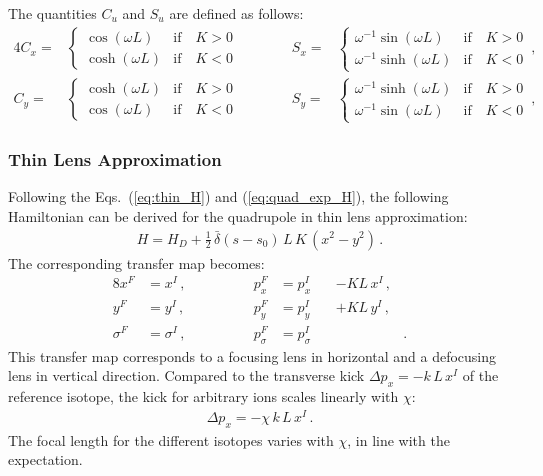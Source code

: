 The quantities $C_u$ and $S_u$ are defined as follows:
\begin{alignat}{4}
C_x = &\begin{cases}  \cos \left( \omega L \right)  & \text{if} \quad  K>0 \\ 
\cosh \left( \omega L \right)  & \text{if} \quad  K<0 \end{cases} \quad \quad \quad&S_x = &\begin{cases}  \omega^{-1}  \sin \left( \omega L \right)  & \text{if} \quad  K>0 \\ \omega^{-1}\sinh \left( \omega L \right)  & \text{if} \quad  K<0 \end{cases} \label{eq:quad_solution1}
\, , \\ 
C_y = &\begin{cases}  \cosh \left( \omega L \right)  & \text{if} \quad  K>0 \\ 
\cos \left( \omega L \right)  & \text{if} \quad  K<0 \end{cases} \quad \quad \quad&S_y = &\begin{cases}  \omega^{-1}  \sinh \left( \omega L \right)  & \text{if} \quad  K>0 \\ \omega^{-1}\sin \left( \omega L \right)   & \text{if} \quad  K<0 \end{cases} \label{eq:quad_solution2}
\, , 
\end{alignat}




\subsubsection{Thin Lens Approximation}

Following the Eqs.~(\ref{eq:thin_H}) and (\ref{eq:quad_exp_H}), the following Hamiltonian can be derived for the quadrupole in thin lens approximation:
%
\begin{align}
  H = H_D + \frac{1}{2} \, \bar{\delta}(s-s_0) \, L \, K \, (x^2-y^2) \, .
\end{align}
The corresponding transfer map becomes:
\begin{alignat}{8}
x^F &= x^I \, ,  \quad \quad \quad \quad &p_x^F &=  p_x^I &&-  K L \, x^I \, , \\ 
y^F &= y^I \, ,  \quad \quad \quad \quad &p_y^F &=  p_y^I &&+  K L \, y^I \, , \\
\sigma^F &= \sigma^I \, ,  \quad \quad \quad \quad &p_\sigma^F &=  p_\sigma^I \, &&  &.
\end{alignat}
This transfer map corresponds to a focusing lens in horizontal and a defocusing lens in vertical direction. Compared to the transverse kick $\Delta p_{x} = - k \, L\, x^I$ of the reference isotope, the kick for arbitrary ions scales linearly with $\chi$:
\begin{align}
\Delta p_{x} = - \chi \, k \, L \, x^I \, .
\end{align}
The focal length for the different isotopes varies with $\chi$, in line with the expectation.

